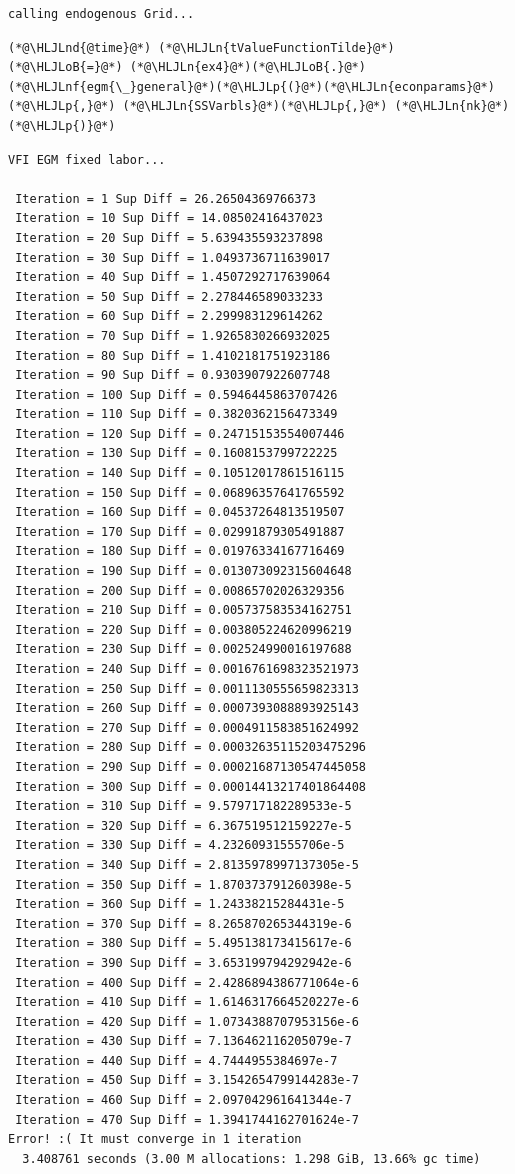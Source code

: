\documentclass[12pt,a4paper]{article}
\newcommand{\HLJLn}[1]{#1}
\newcommand{\HLJLnd}[1]{\textcolor[RGB]{214,102,97}{#1}}
\newcommand{\HLJLnf}[1]{\textcolor[RGB]{66,102,213}{#1}}
\newcommand{\HLJLoB}[1]{\textcolor[RGB]{102,102,102}{\textbf{#1}}}
\newcommand{\HLJLp}[1]{#1}
\begin{document}
\begin{lstlisting}
calling endogenous Grid...
\end{lstlisting}


\begin{lstlisting}
(*@\HLJLnd{@time}@*) (*@\HLJLn{tValueFunctionTilde}@*) (*@\HLJLoB{=}@*) (*@\HLJLn{ex4}@*)(*@\HLJLoB{.}@*)(*@\HLJLnf{egm{\_}general}@*)(*@\HLJLp{(}@*)(*@\HLJLn{econparams}@*)(*@\HLJLp{,}@*) (*@\HLJLn{SSVarbls}@*)(*@\HLJLp{,}@*) (*@\HLJLn{nk}@*)(*@\HLJLp{)}@*)
\end{lstlisting}

\begin{lstlisting}
VFI EGM fixed labor...
 
 Iteration = 1 Sup Diff = 26.26504369766373
 Iteration = 10 Sup Diff = 14.08502416437023
 Iteration = 20 Sup Diff = 5.639435593237898
 Iteration = 30 Sup Diff = 1.0493736711639017
 Iteration = 40 Sup Diff = 1.4507292717639064
 Iteration = 50 Sup Diff = 2.278446589033233
 Iteration = 60 Sup Diff = 2.299983129614262
 Iteration = 70 Sup Diff = 1.9265830266932025
 Iteration = 80 Sup Diff = 1.4102181751923186
 Iteration = 90 Sup Diff = 0.9303907922607748
 Iteration = 100 Sup Diff = 0.5946445863707426
 Iteration = 110 Sup Diff = 0.3820362156473349
 Iteration = 120 Sup Diff = 0.24715153554007446
 Iteration = 130 Sup Diff = 0.1608153799722225
 Iteration = 140 Sup Diff = 0.10512017861516115
 Iteration = 150 Sup Diff = 0.06896357641765592
 Iteration = 160 Sup Diff = 0.04537264813519507
 Iteration = 170 Sup Diff = 0.02991879305491887
 Iteration = 180 Sup Diff = 0.01976334167716469
 Iteration = 190 Sup Diff = 0.013073092315604648
 Iteration = 200 Sup Diff = 0.00865702026329356
 Iteration = 210 Sup Diff = 0.005737583534162751
 Iteration = 220 Sup Diff = 0.003805224620996219
 Iteration = 230 Sup Diff = 0.002524990016197688
 Iteration = 240 Sup Diff = 0.0016761698323521973
 Iteration = 250 Sup Diff = 0.0011130555659823313
 Iteration = 260 Sup Diff = 0.0007393088893925143
 Iteration = 270 Sup Diff = 0.0004911583851624992
 Iteration = 280 Sup Diff = 0.00032635115203475296
 Iteration = 290 Sup Diff = 0.00021687130547445058
 Iteration = 300 Sup Diff = 0.00014413217401864408
 Iteration = 310 Sup Diff = 9.579717182289533e-5
 Iteration = 320 Sup Diff = 6.367519512159227e-5
 Iteration = 330 Sup Diff = 4.23260931555706e-5
 Iteration = 340 Sup Diff = 2.8135978997137305e-5
 Iteration = 350 Sup Diff = 1.870373791260398e-5
 Iteration = 360 Sup Diff = 1.24338215284431e-5
 Iteration = 370 Sup Diff = 8.265870265344319e-6
 Iteration = 380 Sup Diff = 5.495138173415617e-6
 Iteration = 390 Sup Diff = 3.653199794292942e-6
 Iteration = 400 Sup Diff = 2.4286894386771064e-6
 Iteration = 410 Sup Diff = 1.6146317664520227e-6
 Iteration = 420 Sup Diff = 1.0734388707953156e-6
 Iteration = 430 Sup Diff = 7.136462116205079e-7
 Iteration = 440 Sup Diff = 4.7444955384697e-7
 Iteration = 450 Sup Diff = 3.1542654799144283e-7
 Iteration = 460 Sup Diff = 2.097042961641344e-7
 Iteration = 470 Sup Diff = 1.3941744162701624e-7
Error! :( It must converge in 1 iteration
  3.408761 seconds (3.00 M allocations: 1.298 GiB, 13.66% gc time)
\end{lstlisting}
\end{document}
